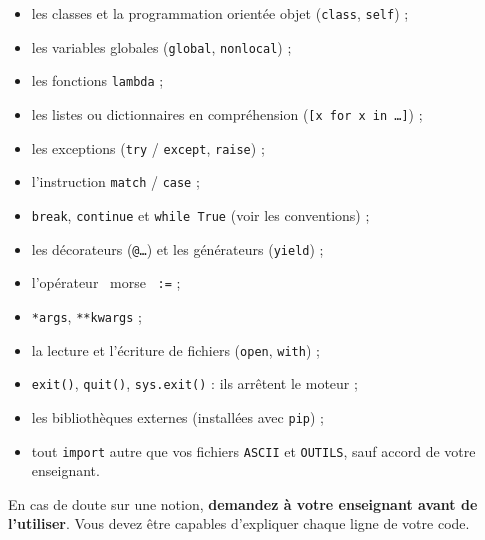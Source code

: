 \documentclass[11pt,a4paper]{article}
\newcommand{\guil}[1]{\guillemotleft~#1~\guillemotright}
\newcommand{\fichier}[1]{\texttt{\color{nuit}#1}}
\begin{document}
\begin{tcolorbox}[enhanced, colback=white, colframe=rouge!70, boxrule=1pt, arc=3pt]
\begin{minipage}[t]{0.48\linewidth}\raggedright
\begin{itemize}[leftmargin=1.2em]
  \item les classes et la programmation orientée objet (\texttt{class}, \texttt{self}) ;
  \item les variables globales (\texttt{global}, \texttt{nonlocal}) ;
  \item les fonctions \texttt{lambda} ;
  \item les listes ou dictionnaires en compréhension\newline
        (\texttt{[x for x in \dots]}) ;
  \item les exceptions (\texttt{try} / \texttt{except}, \texttt{raise}) ;
  \item l'instruction \texttt{match} / \texttt{case} ;
  \item \texttt{break}, \texttt{continue} et \texttt{while True} (voir les conventions) ;
\end{itemize}
\end{minipage}\hfill
\begin{minipage}[t]{0.48\linewidth}\raggedright
\begin{itemize}[leftmargin=1.2em]
  \item les décorateurs (\texttt{@\dots}) et les générateurs (\texttt{yield}) ;
  \item l'opérateur \guil{morse} \texttt{:=} ;
  \item \texttt{*args}, \texttt{**kwargs} ;
  \item la lecture et l'écriture de fichiers (\texttt{open}, \texttt{with}) ;
  \item \texttt{exit()}, \texttt{quit()}, \texttt{sys.exit()} : ils arrêtent le moteur ;
  \item les bibliothèques externes (installées avec \texttt{pip}) ;
  \item tout \texttt{import} autre que vos fichiers \fichier{ASCII} et
        \fichier{OUTILS}, sauf accord de votre enseignant.
\end{itemize}
\end{minipage}
\end{tcolorbox}

En cas de doute sur une notion, \textbf{demandez à votre enseignant avant de l'utiliser}.
Vous devez être capables d'expliquer chaque ligne de votre code.
\end{document}
